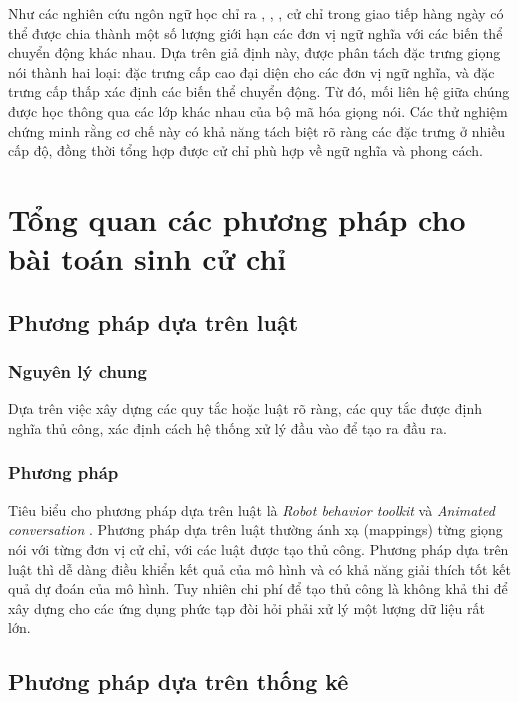 Như các nghiên cứu ngôn ngữ học chỉ ra \cite{kipp2005gesture}, \cite{neff2008gesture}, \cite{webb1997linguistic}, cử chỉ trong giao tiếp hàng ngày có thể được chia thành một số lượng giới hạn các đơn vị ngữ nghĩa với các biến thể chuyển động khác nhau. Dựa trên giả định này, được phân tách đặc trưng giọng nói thành hai loại: đặc trưng cấp cao đại diện cho các đơn vị ngữ nghĩa, và đặc trưng cấp thấp xác định các biến thể chuyển động. Từ đó, mối liên hệ giữa chúng được học thông qua các lớp khác nhau của bộ mã hóa giọng nói. Các thử nghiệm chứng minh rằng cơ chế này có khả năng tách biệt rõ ràng các đặc trưng ở nhiều cấp độ, đồng thời tổng hợp được cử chỉ phù hợp về ngữ nghĩa và phong cách.



\section{Tổng quan các phương pháp cho bài toán sinh cử chỉ}
\label{sec:relatedwork}

\subsection{Phương pháp dựa trên luật}

\subsubsection{Nguyên lý chung}

Dựa trên việc xây dựng các quy tắc hoặc luật rõ ràng, các quy tắc được định nghĩa thủ công, xác định cách hệ thống xử lý đầu vào để tạo ra đầu ra.

\subsubsection{Phương pháp}

Tiêu biểu cho phương pháp dựa trên luật là \textit{Robot behavior toolkit} \cite{huang2012robot} và  \textit{Animated conversation} \cite{cassell1994animated}.
Phương pháp dựa trên luật thường ánh xạ (mappings) từng giọng nói với từng đơn vị cử chỉ, với các luật được tạo thủ công. Phương pháp dựa trên luật thì dễ dàng điều khiển kết quả của mô hình và có khả năng giải thích tốt kết quả dự đoán của mô hình.
Tuy nhiên chi phí để tạo thủ công là không khả thi để xây dựng cho các ứng dụng phức tạp đòi hỏi phải xử lý một lượng dữ liệu rất lớn.

\subsection{Phương pháp dựa trên thống kê}

